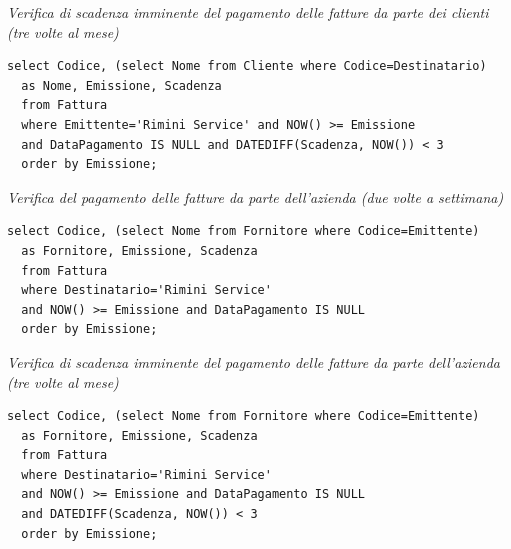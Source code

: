 \noindent\textit{Verifica di scadenza imminente del pagamento delle fatture da parte dei clienti (tre volte al mese)}
\begin{verbatim}
select Codice, (select Nome from Cliente where Codice=Destinatario)
  as Nome, Emissione, Scadenza
  from Fattura
  where Emittente='Rimini Service' and NOW() >= Emissione
  and DataPagamento IS NULL and DATEDIFF(Scadenza, NOW()) < 3
  order by Emissione;
\end{verbatim}
\vspace{0.5cm}

\noindent{}
\newline\newline

\noindent\textit{Verifica del pagamento delle fatture da parte dell'azienda (due volte a settimana)}
\begin{verbatim}
select Codice, (select Nome from Fornitore where Codice=Emittente)
  as Fornitore, Emissione, Scadenza
  from Fattura
  where Destinatario='Rimini Service'
  and NOW() >= Emissione and DataPagamento IS NULL
  order by Emissione;
\end{verbatim}
\vspace{0.5cm}

\noindent{}
\newline\newline

\noindent\textit{Verifica di scadenza imminente del pagamento delle fatture da parte dell'azienda (tre volte al mese)}
\begin{verbatim}
select Codice, (select Nome from Fornitore where Codice=Emittente)
  as Fornitore, Emissione, Scadenza
  from Fattura
  where Destinatario='Rimini Service'
  and NOW() >= Emissione and DataPagamento IS NULL
  and DATEDIFF(Scadenza, NOW()) < 3
  order by Emissione;
\end{verbatim}
\vspace{0.5cm}


